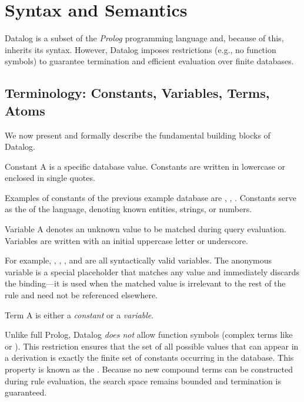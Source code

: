 \section{Syntax and Semantics}

Datalog is a subset of the \emph{Prolog} programming language and, because of this, inherits its syntax. However, Datalog imposes restrictions (e.g., no function symbols) to guarantee termination and efficient evaluation over finite databases.

\subsection{Terminology: Constants, Variables, Terms, Atoms}
We now present and formally describe the fundamental building blocks of Datalog.

\begin{definition}{Constant}
    A  is a specific database value. Constants are written in lowercase or enclosed in single quotes. 
\end{definition}
Examples of constants of the previous example database are , , .
Constants serve as the  of the language, denoting known entities, strings, or numbers.

\begin{definition}{Variable}
    A  denotes an unknown value to be matched during query evaluation. Variables are written with an initial uppercase letter or underscore.
\end{definition}
For example, , , , and \code{\_} are all syntactically valid variables. The anonymous variable \code{\_} is a special placeholder that matches any value and immediately discards the binding---it is used when the matched value is irrelevant to the rest of the rule and need not be referenced elsewhere.

\begin{definition}{Term}
    A  is either a \emph{constant} or a \emph{variable}.
\end{definition}
Unlike full Prolog, Datalog \emph{does not} allow function symbols (complex terms like  or \code{[X|Y]}). 
This restriction ensures that the set of all possible values that can appear in a derivation is exactly the finite set of constants occurring in the database.
This property is known as the . 
Because no new compound terms can be constructed during rule evaluation, the search space remains bounded and termination is guaranteed.

